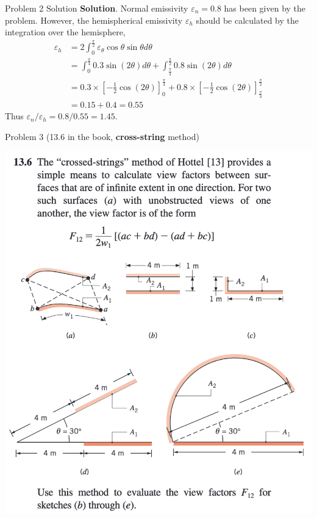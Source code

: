 \documentclass[9pt, aspectratio=169, handout]{beamer}
\begin{document}
\begin{frame}{Problem 2 Solution}
    \textbf{Solution}. Normal emissivity $\varepsilon_n = 0.8$ has been given by the problem. However, the hemispherical emissivity $\varepsilon_h$ should be calculated by the integration over the hemisphere,
    \begin{equation*}
        \begin{aligned}
            \varepsilon_h &= 2 \int_0^{\frac{\pi}{2}} \varepsilon_{\theta} \cos\theta \sin\theta d\theta \\
            &= \int_{0}^{\frac{\pi}{4}} 0.3 \sin(2\theta) d\theta + \int_{\frac{\pi}{4}}^{\frac{\pi}{2}} 0.8 \sin(2\theta) d\theta \\
            &= 0.3\times \left[-\frac{1}{2}\cos(2\theta)\right]_0^{\frac{\pi}{4}} + 0.8\times \left[-\frac{1}{2}\cos(2\theta)\right]_{\frac{\pi}{4}}^{\frac{\pi}{2}} \\
            &= 0.15 + 0.4 = 0.55
        \end{aligned}
    \end{equation*}
    Thus $\varepsilon_n / \varepsilon_h = 0.8 / 0.55 = 1.45$.
    \hfill\qedsymbol
\end{frame}

\begin{frame}{Problem 3 (13.6 in the book, \textbf{cross-string} method)}
    \begin{center}
        \includegraphics[width=.4\textwidth]{Figures/problem_13.6.png}
    \end{center}
\end{frame}
\end{document}
